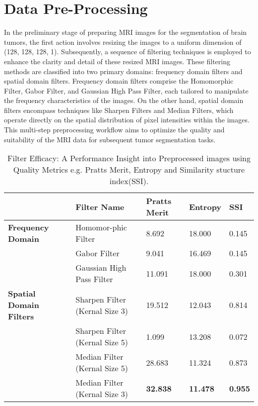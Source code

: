 \section{Data Pre-Processing}
In the preliminary stage of preparing MRI images for the segmentation of brain tumors, the first action involves resizing the images to a uniform dimension of (128, 128, 128, 1). Subsequently, a sequence of filtering techniques is employed to enhance the clarity and detail of these resized MRI images. These filtering methods are classified into two primary domains: frequency domain filters and spatial domain filters. Frequency domain filters comprise the Homomorphic Filter, Gabor Filter, and Gaussian High Pass Filter, each tailored to manipulate the frequency characteristics of the images. On the other hand, spatial domain filters encompass techniques like Sharpen Filters and Median Filters, which operate directly on the spatial distribution of pixel intensities within the images. This multi-step preprocessing workflow aims to optimize the quality and suitability of the MRI data for subsequent tumor segmentation tasks.

\begin{table}[h]
  \centering
  \small
  \begin{tabularx}{\linewidth}{|X|X|X|X|X|}
    \hline
    &\textbf{Filter Name} & \textbf{Pratts Merit} & \textbf{Entropy} & \textbf{SSI} \\
    \hline
    \hline
    \textbf{Frequency Domain }&Homomor-phic Filter & 8.692 & 18.000 & 0.145\\
    \cline{2-5}
    \textbf{}&Gabor Filter & 9.041 & 16.469 & 0.145\\
    \cline{2-5}
    \textbf{}&Gaussian High Pass Filter & 11.091 & 18.000 & 0.301 \\
    \hline
    \hline
    \textbf{Spatial Domain Filters}&Sharpen Filter (Kernal Size 3) & 19.512 & 12.043 & 0.814\\
    \cline{2-5}
    \textbf{}&Sharpen Filter (Kernal Size 5) & 1.099 & 13.208 & 0.072\\
    \cline{2-5}
    &Median Filter (Kernal Size 5) & 28.683 & 11.324 & 0.873\\
    \cline{2-5}
    \textbf{}&Median Filter (Kernal Size 3) & \textbf{32.838} & \textbf{11.478} & \textbf{0.955}\\
    \hline
  \end{tabularx}
  \caption{Filter Efficacy: A Performance Insight into Preprocessed images using Quality Metrics e.g. Pratts Merit, Entropy and Similarity stucture index(SSI).}
  \label{tab:Filter Efficacy}
\end{table}

